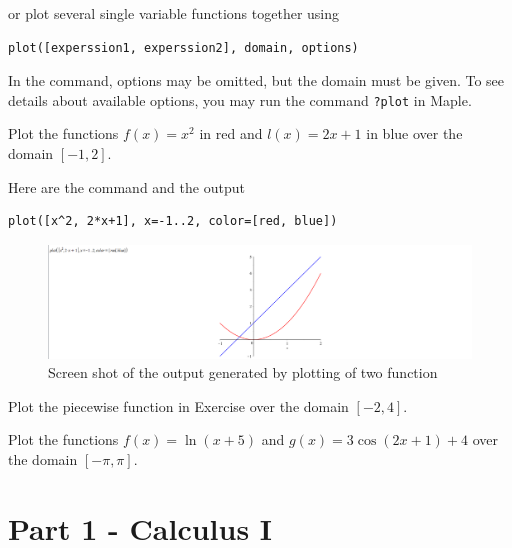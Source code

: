\documentclass[]{book}
\theoremstyle{definition}
\theoremstyle{definition}
\theoremstyle{definition}
\theoremstyle{remark}
\let\BeginKnitrBlock\begin \let\EndKnitrBlock\end
\begin{document}
or plot several single variable functions together using

\begin{verbatim}
plot([experssion1, experssion2], domain, options)
\end{verbatim}

In the command, options may be omitted, but the domain must be given.
To see details about available options, you may run the command \texttt{?plot} in Maple.

\BeginKnitrBlock{example}
\protect\hypertarget{exm:unnamed-chunk-7}{}{\label{exm:unnamed-chunk-7} }
Plot the functions \(f(x)=x^2\) in red and \(l(x)=2x+1\) in blue over the domain \([-1, 2]\).
\EndKnitrBlock{example}

\BeginKnitrBlock{solution}
{}
Here are the command and the output

\begin{verbatim}
plot([x^2, 2*x+1], x=-1..2, color=[red, blue])
\end{verbatim}

\begin{figure}
\centering
\includegraphics{figs/First-Plot-Example.png}
\caption{Screen shot of the output generated by plotting of two function}
\end{figure}
\EndKnitrBlock{solution}

\BeginKnitrBlock{exercise}
\protect\hypertarget{exr:unnamed-chunk-9}{}{\label{exr:unnamed-chunk-9} }
Plot the piecewise function in Exercise  over the domain \([-2, 4]\).
\EndKnitrBlock{exercise}

\BeginKnitrBlock{exercise}
\protect\hypertarget{exr:unnamed-chunk-10}{}{\label{exr:unnamed-chunk-10} }
Plot the functions \(f(x)=\ln(x+5)\) and \(g(x)=3\cos(2x+1)+4\) over the domain \([-\pi, \pi]\).
\EndKnitrBlock{exercise}

\hypertarget{part-part-1---calculus-i}{%
\part*{Part 1 - Calculus I}\label{part-part-1---calculus-i}}
\end{document}
